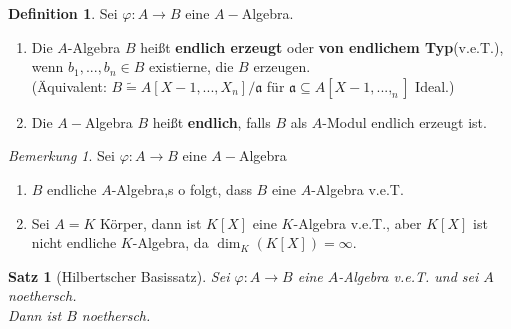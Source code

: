 \documentclass[10pt,a4paper]{article}
\newcommand{\isomorph}{\ensuremath{\tilde{=}}}
\newcounter{thm}[section]
\theoremstyle{definition}
\newtheorem{definition}[thm]{Definition}
\theoremstyle{plain}
\newtheorem{satz}[thm]{Satz}
\theoremstyle{remark}
\newtheorem{bem}[thm]{Bemerkung}
\begin{document}
\begin{definition}
	Sei $\varphi: A\rightarrow B$ eine $A-$Algebra.\\
	\begin{enumerate}
		\item Die $A$-Algebra $B$ heißt \textbf{endlich erzeugt} oder \textbf{von endlichem Typ}(v.e.T.), wenn $b_1,...,b_n\in B$ existierne, die $B$ erzeugen.\\
		(Äquivalent: $B\isomorph A[X-1,...,X_n]/\mathfrak a$ für $\mathfrak a\subseteq A[X-1,...,_n]$ Ideal.)
		
		\item Die $A-$Algebra $B$ heißt \textbf{endlich}, falls $B$ als $A$-Modul endlich erzeugt ist.
	\end{enumerate}
\end{definition}
\begin{bem}
	Sei $\varphi:A\rightarrow B$ eine $A-$Algebra\begin{enumerate}
		\item $B$ endliche $A$-Algebra,s o folgt, dass $B$ eine $A$-Algebra v.e.T.
		\item Sei $A=K$ Körper, dann ist $K[X]$ eine $K$-Algebra v.e.T., aber $K[X]$ ist nicht endliche $K$-Algebra, da $\dim_K(K[X])=\infty$.
	\end{enumerate}
\end{bem}
\begin{satz}[Hilbertscher Basissatz]
	Sei $\varphi:A\rightarrow B$ eine $A$-Algebra v.e.T. und sei $A$ noethersch.\\
	Dann ist $B$ noethersch.
\end{satz}
\end{document}

